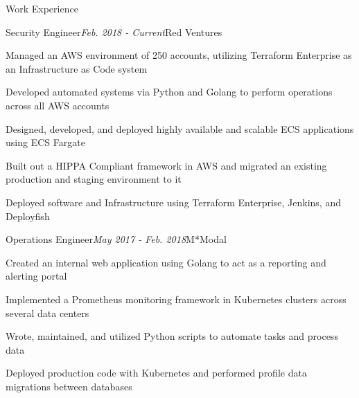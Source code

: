 \documentclass{resume} %
\begin{document}
\begin{rSection}{\vspace{-5pt}Work Experience}

\begin{rSubsection}{Security Engineer}{\em Feb. 2018 - Current}{Red Ventures}{}
\item {Managed an AWS environment of 250 accounts, utilizing Terraform Enterprise as an Infrastructure as Code system}
\item {Developed automated systems via Python and Golang to perform operations across all AWS accounts}
\item {Designed, developed, and deployed highly available and scalable ECS applications using ECS Fargate}
\item {Built out a HIPPA Compliant framework in AWS and migrated an existing production and staging environment to it }
\item {Deployed software and Infrastructure using Terraform Enterprise, Jenkins, and Deployfish}

\end{rSubsection}



\begin{rSubsection}{Operations Engineer}{\em May 2017 - Feb. 2018}{M*Modal}{}
\item {Created an internal web application using Golang to act as a reporting and alerting portal}
\item {Implemented a Prometheus monitoring framework in Kubernetes clusters across several data centers}
\item {Wrote, maintained, and utilized Python scripts to automate tasks and process data}
\item {Deployed production code with Kubernetes and performed profile data migrations between databases}
\end{rSubsection}

\end{rSection}
\end{document}
